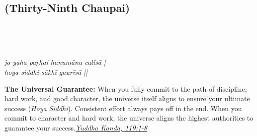 
\newpage

\subsection*{ (Thirty-Ninth Chaupai)}

\begin{minipage}[t]{0.55\textwidth}
\vspace{0pt}

{\large \linespread{1.5}\selectfont
{}\\
\par}

\vspace{0.5em}

{\large \linespread{1.5}\selectfont
{}\\
\par}

\vspace{0.5em}

{\large \linespread{1.3}\selectfont
\textit{jo yaha paṛhai hanumāna calīsā |}\\
\textit{hoya siddhi sākhī gaurīsā ||}
\par}
\end{minipage}%
\hfill
\begin{minipage}[t]{0.42\textwidth}
\vspace{0pt}
\begin{tcolorbox}[anchorbox]
\textbf{The Universal Guarantee:} When you fully commit to the path of discipline, hard work, and good character, the universe itself aligns to ensure your ultimate success (\textit{Hoya Siddhi}). Consistent effort always pays off in the end.
\vspace{0.5em}\newline When you commit to character and hard work, the universe aligns the highest authorities to guarantee your success.\newline\null\hfill\href{https://www.valmiki.iitk.ac.in/sloka?field_kanda_tid=6&language=dv&field_sarga_value=119}{\textit{Yuddha Kanda, 119:1-8}}
\end{tcolorbox}
\end{minipage}

\vspace{0.5em}
